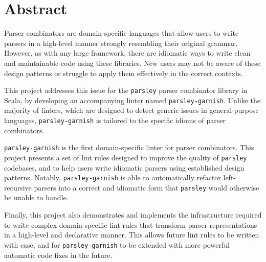 \documentclass[../../main.tex]{subfiles}
\begin{document}
\hspace{0pt}
\vfill
\section*{\centering Abstract}
\noindent
Parser combinators are domain-specific languages that allow users to write parsers in a high-level manner strongly resembling their original grammar.
However, as with any large framework, there are idiomatic ways to write clean and maintainable code using these libraries.
New users may not be aware of these design patterns or struggle to apply them effectively in the correct contexts.
\newline

\noindent
This project addresses this issue for the \texttt{parsley} parser combinator library in Scala, by developing an accompanying linter named \texttt{parsley-garnish}.
Unlike the majority of linters, which are designed to detect generic issues in general-purpose languages, \texttt{parsley-garnish} is tailored to the specific idioms of parser combinators.
\newline

\noindent
\texttt{parsley-garnish} is the first domain-specific linter for parser combinators.
This project presents a set of lint rules designed to improve the quality of \texttt{parsley} codebases, and to help users write idiomatic parsers using established design patterns.
Notably, \texttt{parsley-garnish} is able to automatically refactor left-recursive parsers into a correct and idiomatic form that \texttt{parsley} would otherwise be unable to handle.
\newline

\noindent
Finally, this project also demonstrates and implements the infrastructure required to write complex domain-specific lint rules that transform parser representations in a high-level and declarative manner.
This allows future lint rules to be written with ease, and for \texttt{parsley-garnish} to be extended with more powerful automatic code fixes in the future.
\vfill
\hspace{0pt}
\end{document}
